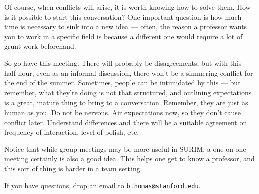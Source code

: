 Of course, when conflicts will arise, it is worth knowing how to solve them. How is it possible to start this conversation? One important question is how much time is necessary to sink into a new idea --- often, the reason a professor wants you to work in a specific field is because a different one would require a lot of grunt work beforehand.

So go have this meeting. There will probably be disagreements, but with this half-hour, even as an informal discussion, there won't be a simmering conflict for the end of the summer. Sometimes, people can be intimidated by this --- but remember, what they're doing is not that structured, and outlining expectations is a great, mature thing to bring to a conversation. Remember, they are just as human as you. Do not be nervous. Air expectations now, so they don't cause conflict later. Understand differences and there will be a suitable agreement on frequency of interaction, level of polish, etc.

Notice that while group meetings may be more useful in SURIM, a one-on-one meeting certainly is also a good idea. This helps one get to know a professor, and this sort of thing is harder in a team setting.

If you have questions, drop an email to \texttt{\href{mailto:bthomas@stanford.edu}{bthomas@stanford.edu}}.
%
